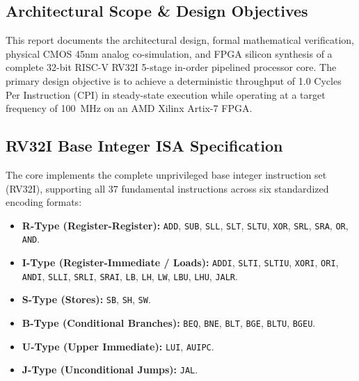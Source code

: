 \documentclass[10.5pt,a4paper]{article}
\begin{document}
\subsection{Architectural Scope \& Design Objectives}
This report documents the architectural design, formal mathematical verification, physical CMOS 45nm analog co-simulation, and FPGA silicon synthesis of a complete 32-bit RISC-V RV32I 5-stage in-order pipelined processor core. The primary design objective is to achieve a deterministic throughput of 1.0 Cycles Per Instruction (CPI) in steady-state execution while operating at a target frequency of 100~MHz on an AMD Xilinx Artix-7 FPGA.

\subsection{RV32I Base Integer ISA Specification}
The core implements the complete unprivileged base integer instruction set (RV32I), supporting all 37 fundamental instructions across six standardized encoding formats:
\begin{itemize}
  \setlength\itemsep{1pt}
  \item \textbf{R-Type (Register-Register):} \texttt{ADD}, \texttt{SUB}, \texttt{SLL}, \texttt{SLT}, \texttt{SLTU}, \texttt{XOR}, \texttt{SRL}, \texttt{SRA}, \texttt{OR}, \texttt{AND}.
  \item \textbf{I-Type (Register-Immediate / Loads):} \texttt{ADDI}, \texttt{SLTI}, \texttt{SLTIU}, \texttt{XORI}, \texttt{ORI}, \texttt{ANDI}, \texttt{SLLI}, \texttt{SRLI}, \texttt{SRAI}, \texttt{LB}, \texttt{LH}, \texttt{LW}, \texttt{LBU}, \texttt{LHU}, \texttt{JALR}.
  \item \textbf{S-Type (Stores):} \texttt{SB}, \texttt{SH}, \texttt{SW}.
  \item \textbf{B-Type (Conditional Branches):} \texttt{BEQ}, \texttt{BNE}, \texttt{BLT}, \texttt{BGE}, \texttt{BLTU}, \texttt{BGEU}.
  \item \textbf{U-Type (Upper Immediate):} \texttt{LUI}, \texttt{AUIPC}.
  \item \textbf{J-Type (Unconditional Jumps):} \texttt{JAL}.
\end{itemize}
\end{document}
